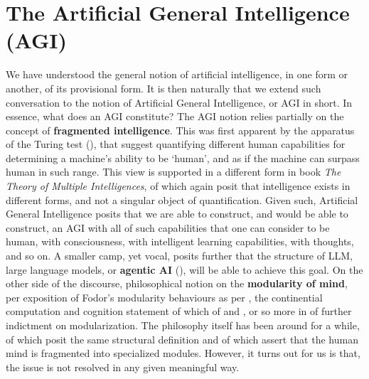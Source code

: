 \section{The Artificial General Intelligence (AGI)}
We have understood the general notion of artificial intelligence, in one form or another, of its provisional form. It is then naturally that we extend such conversation to the notion of Artificial General Intelligence, or AGI in short. In essence, what does an AGI constitute? The AGI notion relies partially on the concept of \textbf{fragmented intelligence}. This was first apparent by the apparatus of the Turing test (\cite{turing1950computing}), that suggest quantifying different human capabilities for determining a machine's ability to be `human', and as if the machine can surpass human in such range. This view is supported in a different form in \cite{gardner1983frames} book \textit{The Theory of Multiple Intelligences}, of which again posit that intelligence exists in different forms, and not a singular object of quantification. Given such, Artificial General Intelligence posits that we are able to construct, and would be able to construct, an AGI with all of such capabilities that one can consider to be human, with consciousness, with intelligent learning capabilities, with thoughts, and so on. A smaller camp, yet vocal, posits further that the structure of LLM, large language models, or \textbf{agentic AI} (\cite{sapkota2025agentic,derouiche2025agentic,schneider2025generative,wei2025agentic,raza2025trism}), will be able to achieve this goal. On the other side of the discourse, philosophical notion on the \textbf{modularity of mind}, per \cite{RobbinsDrayson2025_ModularityOfMind} exposition of Fodor's modularity behaviours as per \cite{fodor1983modularity,fodor1985precis,fodor2000mind,marr1982vision}, the continential computation and cognition statement of which of \cite{pylyshyn1984computation} and \cite{barkow1992adapted}, or so more in \cite{pinker1997how,carruthers2006architecture,sperber2002pragmatics} of further indictment on modularization. The philosophy itself has been around for a while, of which posit the same structural definition and of which assert that the human mind is fragmented into specialized modules. However, it turns out for us is that, the issue is not resolved in any given meaningful way. 

